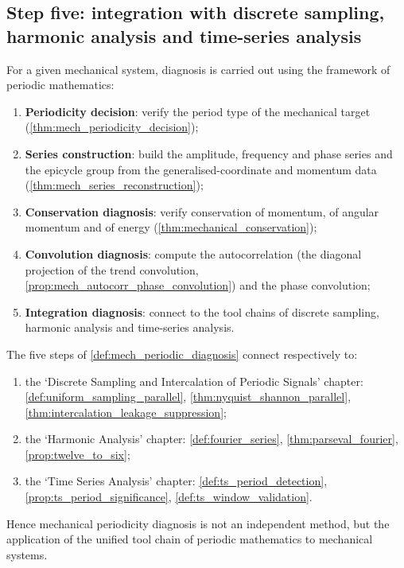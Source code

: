 \subsection{Step five: integration with discrete sampling, harmonic analysis and time-series analysis}

\begin{definition}\label{def:mech_periodic_diagnosis}
For a given mechanical system, diagnosis is carried out using the framework of periodic mathematics:
\begin{enumerate}[label=(\roman*)]
    \item \textbf{Periodicity decision}: verify the period type of the mechanical target (\cref{thm:mech_periodicity_decision});
    \item \textbf{Series construction}: build the amplitude, frequency and phase series and the epicycle group from the generalised-coordinate and momentum data (\cref{thm:mech_series_reconstruction});
    \item \textbf{Conservation diagnosis}: verify conservation of momentum, of angular momentum and of energy (\cref{thm:mechanical_conservation});
    \item \textbf{Convolution diagnosis}: compute the autocorrelation (the diagonal projection of the trend convolution, \cref{prop:mech_autocorr_phase_convolution}) and the phase convolution;
    \item \textbf{Integration diagnosis}: connect to the tool chains of discrete sampling, harmonic analysis and time-series analysis.
\end{enumerate}
\end{definition}

\begin{theorem}\label{thm:mech_diagnosis_integration}
The five steps of \cref{def:mech_periodic_diagnosis} connect respectively to:
\begin{enumerate}[label=(\roman*)]
    \item the `Discrete Sampling and Intercalation of Periodic Signals' chapter: \cref{def:uniform_sampling_parallel}, \cref{thm:nyquist_shannon_parallel}, \cref{thm:intercalation_leakage_suppression};
    \item the `Harmonic Analysis' chapter: \cref{def:fourier_series}, \cref{thm:parseval_fourier}, \cref{prop:twelve_to_six};
    \item the `Time Series Analysis' chapter: \cref{def:ts_period_detection}, \cref{prop:ts_period_significance}, \cref{def:ts_window_validation}.
\end{enumerate}
Hence mechanical periodicity diagnosis is not an independent method, but the application of the unified tool chain of periodic mathematics to mechanical systems.
\end{theorem}

